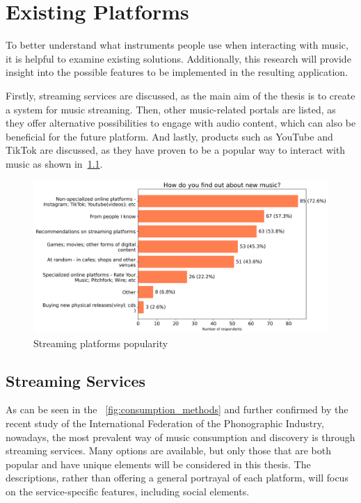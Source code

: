 \chapter{Existing Platforms}\label{chap:platforms}

To better understand what instruments people use when interacting with music,
it is helpful to examine existing solutions. Additionally, this research will provide insight
into the possible features to be implemented in the resulting application.

Firstly, streaming services are discussed, as the main aim of the thesis is to create a system for music streaming.
Then, other music-related portals are listed, as they offer alternative possibilities to engage with audio content, which
can also be beneficial for the future platform.
And lastly, products such as YouTube and TikTok are discussed, as they have proven to be a popular way to interact
with music as shown in~\ref{fig:discovery_methods}.

\begin{figure}[htbp]
    \centering
    \includegraphics[height=0.4\textheight]{charts/discovery methods.png}
    \caption{Streaming platforms popularity}
    \label{fig:discovery_methods}
\end{figure}


\section{Streaming Services}
As can be seen in the ~\ref{fig:consumption_methods} and further confirmed by
the recent study of the International Federation of the Phonographic Industry\cite{music_stats_2024},
nowadays, the most prevalent way of music consumption
and discovery is through streaming services. Many options are available,
but only those that are both popular and have unique elements will be considered in this thesis.
The descriptions, rather than offering a general portrayal of each platform,
will focus on the service-specific features, including social elements.

